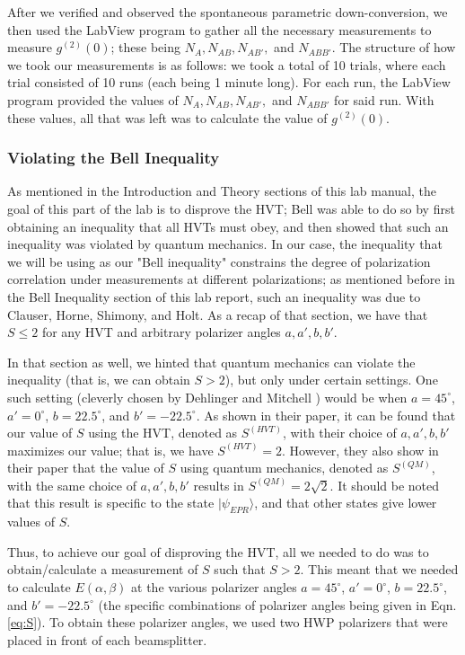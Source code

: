 \documentclass[twocolumn,amsmath,amssymb,pra]{revtex4-2}
\begin{document}
After we verified and observed the spontaneous parametric down-conversion, we then used the LabView program to gather all the necessary measurements to measure $g^{(2)}(0)$; these being $N_{A}, N_{AB}, N_{AB'},$ and $N_{ABB'}$. The structure of how we took our measurements is as follows: we took a total of 10 trials, where each trial consisted of 10 runs (each being 1 minute long). For each run, the LabView program provided the values of $N_{A}, N_{AB}, N_{AB'},$ and $N_{ABB'}$ for said run. With these values, all that was left was to calculate the value of $g^{(2)}(0)$.

\subsubsection{Violating the Bell Inequality}
As mentioned in the Introduction and Theory sections of this lab manual, the goal of this part of the lab is to disprove the HVT; Bell was able to do so by first obtaining an inequality that all HVTs must obey, and then showed that such an inequality was violated by quantum mechanics. In our case, the inequality that we will be using as our "Bell inequality" constrains the degree of polarization correlation under measurements at different polarizations; as mentioned before in the Bell Inequality section of this lab report, such an inequality was due to Clauser, Horne, Shimony, and Holt. As a recap of that section, we have that $S \leq 2$ for any HVT and arbitrary polarizer angles $a, a', b, b'$. 

In that section as well, we hinted that quantum mechanics can violate the inequality (that is, we can obtain $S > 2$), but only under certain settings.
One such setting (cleverly chosen by Dehlinger and Mitchell \cite{D_M}) would be when $a = 45^{\circ}$, $a' = 0^{\circ}$, $b = 22.5^{\circ}$, and $b' = -22.5^{\circ}$. As shown in their paper, it can be found that our value of $S$ using the HVT, denoted as $S^{(HVT)}$, with their choice of $a, a', b, b'$ maximizes our value; that is, we have $S^{(HVT)} = 2$. However, they also show in their paper that the value of $S$ using quantum mechanics, denoted as $S^{(QM)}$, with the same choice of $a, a', b, b'$ results in $S^{(QM)} = 2 \sqrt{2}$. It should be noted that this result is specific to the state $\vert \psi_{EPR} \rangle$, and that other states give lower values of $S$.

Thus, to achieve our goal of disproving the HVT, all we needed to do was to obtain/calculate a measurement of $S$ such that $S > 2$. This meant that we needed to calculate $E(\alpha, \beta)$ at the various polarizer angles $a = 45^{\circ}$, $a' = 0^{\circ}$, $b = 22.5^{\circ}$, and $b' = -22.5^{\circ}$ (the specific combinations of polarizer angles being given in Eqn. \ref{eq:S}). To obtain these polarizer angles, we used two HWP polarizers that were placed in front of each beamsplitter. 
\end{document}
